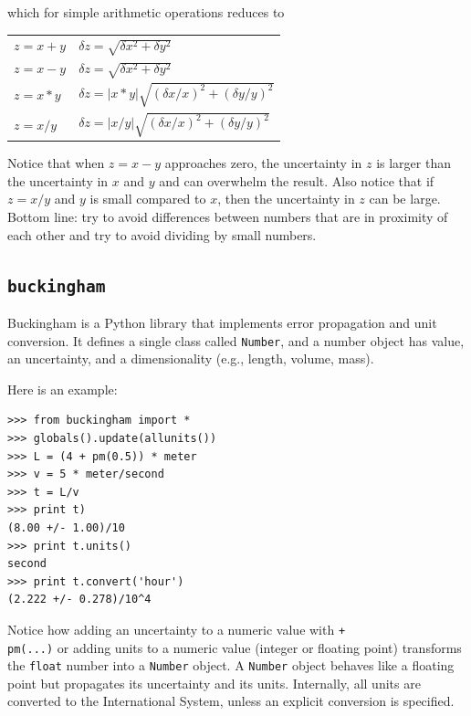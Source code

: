 \documentclass[justified,sixbynine]{tufte-book}
\def\ft{\small\tt}
\theoremstyle{plain}%
\theoremstyle{definition}
\theoremstyle{remark}
\begin{document}
\begin{fullwidth}
which for simple arithmetic operations reduces to

\begin{tabular}{ll}
  $z = x + y$ &
  $\delta z = \sqrt{\delta x^2 + \delta y^2 }$ \\
  $z = x - y$ &
  $\delta z = \sqrt{\delta x^2 + \delta y^2 }$ \\
  $z = x * y$ &
  $\delta z = |x*y|\sqrt{(\delta x/x)^2 + (\delta y/y)^2 }$ \\
  $z = x / y$ &
  $\delta z = |x/y|\sqrt{(\delta x/x)^2 + (\delta y/y)^2 }$ \\
\end{tabular}

Notice that when $z=x-y$ approaches zero, the uncertainty in $z$ is larger than the uncertainty in $x$ and $y$ and can overwhelm the result.
Also notice that if $z=x/y$ and $y$ is small compared to $x$, then the uncertainty in $z$ can be large.
Bottom line: try to avoid differences between numbers that are in proximity of each other and try to avoid dividing by small numbers.

\goodbreak\subsection{{\ft buckingham}}

Buckingham is a Python library that implements error propagation and unit conversion. It defines a single class called {\ft Number}, and a number object has value, an uncertainty, and a dimensionality (e.g., length, volume, mass).

Here is an example:

\begin{lstlisting}
>>> from buckingham import *
>>> globals().update(allunits())
>>> L = (4 + pm(0.5)) * meter
>>> v = 5 * meter/second
>>> t = L/v
>>> print t)                                                                                               
(8.00 +/- 1.00)/10
>>> print t.units()
second
>>> print t.convert('hour')
(2.222 +/- 0.278)/10^4
\end{lstlisting}

Notice how adding an uncertainty to a numeric value with {\ft +\\pm(...)} or adding units to a numeric value (integer or floating point) transforms the {\ft float} number into a {\ft Number} object. A {\ft Number} object behaves like a floating point but propagates its uncertainty and its units.  Internally, all units are converted to the International System, unless an explicit conversion is specified.


\end{fullwidth}
\end{document}
